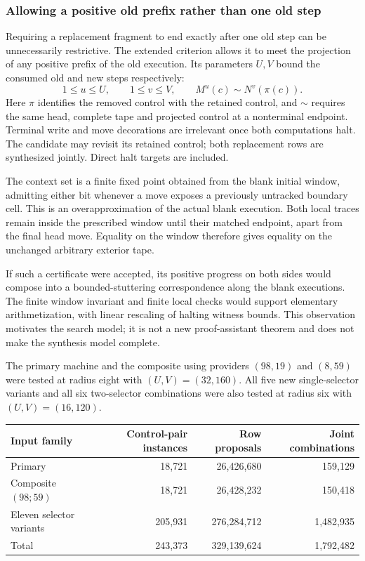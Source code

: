 \subsubsection{Allowing a positive old prefix rather than one old step}

Requiring a replacement fragment to end exactly after one old step can be
unnecessarily restrictive. The extended criterion allows it to meet the
projection of any positive prefix of the old execution. Its parameters
$U,V$ bound the consumed old and new steps respectively:
\[
  1\leq u\leq U,\qquad 1\leq v\leq V,
  \qquad M^{u}(c)\sim N^{v}(\pi(c)).
\]
Here $\pi$ identifies the removed control with the retained control, and
$\sim$ requires the same head, complete tape and projected control at a
nonterminal endpoint. Terminal write and move decorations are irrelevant
once both computations halt. The candidate may revisit its retained control;
both replacement rows are synthesized jointly. Direct halt targets are
included.

The context set is a finite fixed point obtained from the blank initial
window, admitting either bit whenever a move exposes a previously untracked
boundary cell. This is an overapproximation of the actual blank execution.
Both local traces remain inside the prescribed window until their matched
endpoint, apart from the final head move. Equality on the window therefore
gives equality on the unchanged arbitrary exterior tape.

If such a certificate were accepted, its positive progress on both sides
would compose into a bounded-stuttering correspondence along the blank
executions. The finite window invariant and finite local checks would
support elementary arithmetization, with linear rescaling of halting
witness bounds. This observation motivates the search model; it is not a
new proof-assistant theorem and does not make the synthesis model complete.

The primary machine and the composite using providers $(98,19)$ and
$(8,59)$ were tested at radius eight with $(U,V)=(32,160)$. All five new
single-selector variants and all six two-selector combinations were also
tested at radius six with $(U,V)=(16,120)$.

\begin{center}\small
\begin{tabular}{lrrr}
\hline
Input family & Control-pair instances & Row proposals & Joint combinations\\
\hline
Primary & 18,721 & 26,426,680 & 159,129\\
Composite $(98;59)$ & 18,721 & 26,428,232 & 150,418\\
Eleven selector variants & 205,931 & 276,284,712 & 1,482,935\\
\hline
Total & 243,373 & 329,139,624 & 1,792,482\\
\hline
\end{tabular}
\end{center}

